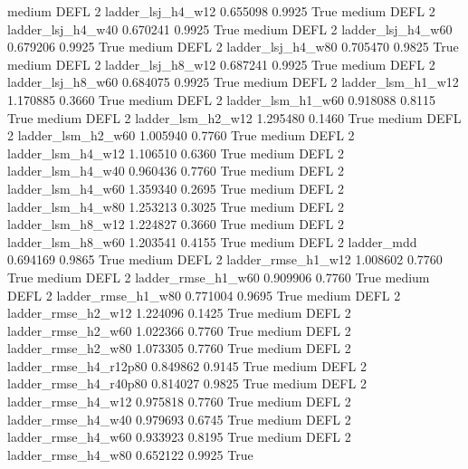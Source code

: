     medium     DEFL                 2      ladder_lsj_h4_w12   0.655098      0.9925    True
    medium     DEFL                 2      ladder_lsj_h4_w40   0.670241      0.9925    True
    medium     DEFL                 2      ladder_lsj_h4_w60   0.679206      0.9925    True
    medium     DEFL                 2      ladder_lsj_h4_w80   0.705470      0.9825    True
    medium     DEFL                 2      ladder_lsj_h8_w12   0.687241      0.9925    True
    medium     DEFL                 2      ladder_lsj_h8_w60   0.684075      0.9925    True
    medium     DEFL                 2      ladder_lsm_h1_w12   1.170885      0.3660    True
    medium     DEFL                 2      ladder_lsm_h1_w60   0.918088      0.8115    True
    medium     DEFL                 2      ladder_lsm_h2_w12   1.295480      0.1460    True
    medium     DEFL                 2      ladder_lsm_h2_w60   1.005940      0.7760    True
    medium     DEFL                 2      ladder_lsm_h4_w12   1.106510      0.6360    True
    medium     DEFL                 2      ladder_lsm_h4_w40   0.960436      0.7760    True
    medium     DEFL                 2      ladder_lsm_h4_w60   1.359340      0.2695    True
    medium     DEFL                 2      ladder_lsm_h4_w80   1.253213      0.3025    True
    medium     DEFL                 2      ladder_lsm_h8_w12   1.224827      0.3660    True
    medium     DEFL                 2      ladder_lsm_h8_w60   1.203541      0.4155    True
    medium     DEFL                 2             ladder_mdd   0.694169      0.9865    True
    medium     DEFL                 2     ladder_rmse_h1_w12   1.008602      0.7760    True
    medium     DEFL                 2     ladder_rmse_h1_w60   0.909906      0.7760    True
    medium     DEFL                 2     ladder_rmse_h1_w80   0.771004      0.9695    True
    medium     DEFL                 2     ladder_rmse_h2_w12   1.224096      0.1425    True
    medium     DEFL                 2     ladder_rmse_h2_w60   1.022366      0.7760    True
    medium     DEFL                 2     ladder_rmse_h2_w80   1.073305      0.7760    True
    medium     DEFL                 2  ladder_rmse_h4_r12p80   0.849862      0.9145    True
    medium     DEFL                 2  ladder_rmse_h4_r40p80   0.814027      0.9825    True
    medium     DEFL                 2     ladder_rmse_h4_w12   0.975818      0.7760    True
    medium     DEFL                 2     ladder_rmse_h4_w40   0.979693      0.6745    True
    medium     DEFL                 2     ladder_rmse_h4_w60   0.933923      0.8195    True
    medium     DEFL                 2     ladder_rmse_h4_w80   0.652122      0.9925    True

